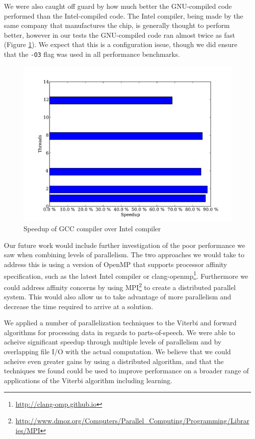 \documentclass[11pt,onecolumn]{article}
\begin{document}
We were also caught off guard by how much better the GNU-compiled code performed than the Intel-compiled code. The Intel compiler, being made by the same company that manufactures the chip, is generally thought to perform better, however in our tests the GNU-compiled code ran almost twice as fast (Figure \ref{fig:gccvsintel}). We expect that this is a configuration issue, though we did ensure that the \texttt{-O3} flag was used in all performance benchmarks.

\begin{figure}[h!]
\centering
\includegraphics[width=.75\linewidth]{figures/comparison_of_intel_and_gnu_comiler_performance}
\caption{Speedup of GCC compiler over Intel compiler}
\label{fig:gccvsintel}
\end{figure}


Our future work would include further investigation of the poor performance we saw when combining levels of parallelism. The two approaches we would take to address this is using a version of OpenMP that supports processor affinity specification, such as the latest Intel compiler or clang-openmp\footnote{\url{http://clang-omp.github.io}}. Furthermore we could address affinity concerns by using MPI\footnote{\url{http://www.dmoz.org/Computers/Parallel_Computing/Programming/Libraries/MPI}} to create a distributed parallel system. This would also allow us to take advantage of more parallelism and decrease the time required to arrive at a solution.


We applied a number of parallelization techniques to the Viterbi and forward algorithms for processing data in regards to parts-of-speech. We were able to acheive significant speedup through multiple levels of parallelism and by overlapping file I/O with the actual computation. We believe that we could acheive even greater gains by using a distributed algorithm, and that the techniques we found could be used to improve performance on a broader range of applications of the Viterbi algorithm including learning.
\end{document}
